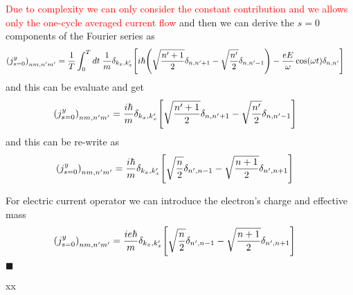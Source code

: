 \textcolor{red}{Due to complexity we can only consider the constant contribution and we allows only the one-cycle averaged current flow} and then we can derive the $s=0$ components of the Fourier series as
\begin{equation} \label{6.24}
  \begin{aligned}
    \qty({j}^y_{s=0})_{nm,n'm'} & =
    \frac{1}{T} \int_0^T dt \;
    \frac{1}{{m}}
    \delta_{k_x,k'_x}
    \qty[i\hbar \qty(
    \sqrt{\frac{n'+1}{2}} \delta_{n,n'+1}
    - \sqrt{\frac{n'}{2}} \delta_{n,n'-1}
    ) - \frac{eE}{\omega}\cos(\omega t) \delta_{n,n'}]
  \end{aligned}
\end{equation}
and this can be evaluate and get
\begin{equation} \label{6.25}
  \begin{aligned}
    \qty({j}^y_{s=0})_{nm,n'm'} & =
    \frac{i\hbar}{{m}}
    \delta_{k_x,k'_x}
    \qty[
    \sqrt{\frac{n'+1}{2}} \delta_{n,n'+1}
    - \sqrt{\frac{n'}{2}} \delta_{n,n'-1}
    ]
  \end{aligned}
\end{equation}
and this can be re-write as
\begin{equation} \label{6.26}
  \begin{aligned}
    \qty({j}^y_{s=0})_{nm,n'm'} & =
    \frac{i\hbar}{{m}}
    \delta_{k_x,k'_x}
    \qty[
    \sqrt{\frac{n}{2}} \delta_{n',n-1}
    - \sqrt{\frac{n+1}{2}} \delta_{n',n+1}
    ]
  \end{aligned}
\end{equation}

\noindent
For electric current operator we can introduce the electron's charge and effective mass
\begin{equation} \label{6.27}
  \begin{aligned}
    \qty({j}^y_{s=0})_{nm,n'm'} & =
    \frac{ie\hbar}{{m}}
    \delta_{k_x,k'_x}
    \qty[
    \sqrt{\frac{n}{2}} \delta_{n',n-1}
    - \sqrt{\frac{n+1}{2}} \delta_{n',n+1}
    ]
  \end{aligned}
\end{equation}
\hfill$\blacksquare$




























xx
